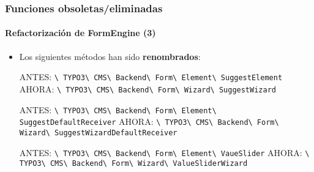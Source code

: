 \begin{frame}[fragile]
	\frametitle{Funciones obsoletas/eliminadas}
	\framesubtitle{Refactorización de FormEngine (3)}

	\begin{itemize}

		\item Los siguientes métodos han sido \textbf{renombrados}:\newline

			\smaller
				ANTES:\tabto{1.0cm}
					\texttt{\textbackslash
						TYPO3\textbackslash
						CMS\textbackslash
						Backend\textbackslash
						Form\textbackslash
						Element\textbackslash
						SuggestElement}\newline
				AHORA:\tabto{1.0cm}
					\texttt{\textbackslash
						TYPO3\textbackslash
						CMS\textbackslash
						Backend\textbackslash
						Form\textbackslash
						Wizard\textbackslash
						SuggestWizard}\newline

				ANTES:\tabto{1.0cm}
					\texttt{\textbackslash
						TYPO3\textbackslash
						CMS\textbackslash
						Backend\textbackslash
						Form\textbackslash
						Element\textbackslash
						SuggestDefaultReceiver}\newline
				AHORA:\tabto{1.0cm}
					\texttt{\textbackslash
						TYPO3\textbackslash
						CMS\textbackslash
						Backend\textbackslash
						Form\textbackslash
						Wizard\textbackslash
						SuggestWizardDefaultReceiver}\newline

				ANTES:\tabto{1.0cm}
					\texttt{\textbackslash
						TYPO3\textbackslash
						CMS\textbackslash
						Backend\textbackslash
						Form\textbackslash
						Element\textbackslash
						VaueSlider}\newline
				AHORA:\tabto{1.0cm}
					\texttt{\textbackslash
						TYPO3\textbackslash
						CMS\textbackslash
						Backend\textbackslash
						Form\textbackslash
						Wizard\textbackslash
						ValueSliderWizard}\newline

			\normalsize

	\end{itemize}

\end{frame}

